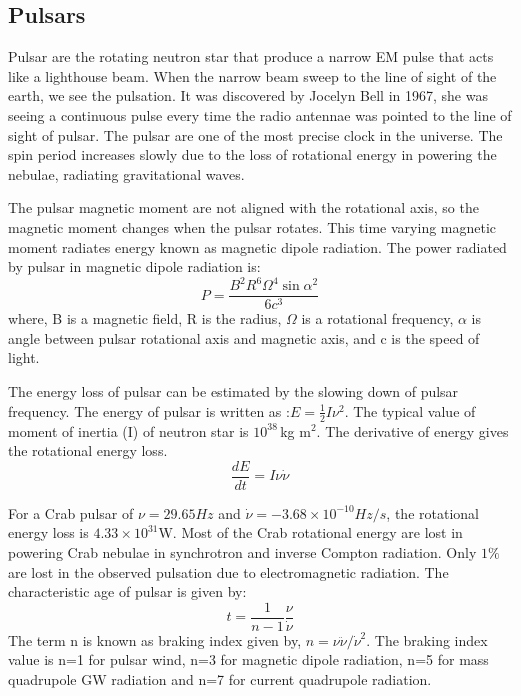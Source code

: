 \documentclass{ttuthes2007}
\begin{document}
\subsection{Pulsars}
Pulsar are the rotating neutron star that produce a narrow \ac{EM} pulse that
acts like a lighthouse beam. When the narrow beam sweep to the line of sight of
the earth, we see the pulsation.  It was discovered by Jocelyn Bell in 1967, she
was seeing a continuous pulse every time the radio antennae was pointed to the
line of sight of pulsar. The pulsar are one of the most precise clock in the
universe. The spin period increases slowly due to the loss of rotational energy
in powering the nebulae, radiating gravitational waves. 

The pulsar magnetic moment are not aligned with the rotational axis, so the
magnetic moment changes when the pulsar rotates. This time varying magnetic
moment radiates energy known as magnetic dipole radiation. The power radiated by
pulsar in magnetic dipole radiation is:
\begin{equation}
P= \frac{B^2R^6\Omega^4\sin{\alpha}^2}{6c^3}
\end{equation}
where, B is a magnetic field, R is the radius, $\Omega$ is a rotational
frequency, $\alpha$ is angle between pulsar rotational axis and magnetic axis,
and c is the speed of light.  

The energy loss of pulsar can be estimated by the slowing down of pulsar
frequency. The energy of pulsar is written as :$E=\frac{1}{2} I \nu^2$. The
typical value of moment of inertia (I) of neutron star is $10^{38}$\,kg m$^2$. The
derivative of energy gives the rotational energy loss.
\begin{equation}
\frac{dE}{dt}= I\nu\dot{\nu}
\end{equation}

For a Crab pulsar of $\nu=29.65Hz$ and $\dot{\nu}= -3.68\times10^{-10}Hz/s$, the
rotational energy loss is $4.33\times10^{31}$W. Most of the Crab rotational energy
are lost in powering Crab nebulae in synchrotron and inverse Compton radiation.
Only $1\%$ are lost  in the observed pulsation due to electromagnetic radiation.
The characteristic age of pulsar is given by:
\begin{equation}
t= \frac{1}{n-1}\frac{\nu}{\dot{\nu}}
\end{equation} 
The term n is known as braking index given by, $n=\nu\ddot{\nu}/\dot{\nu}^2$. 
The braking index value is n=1 for pulsar wind, n=3 for magnetic dipole
radiation, n=5 for mass quadrupole \ac{GW} radiation and n=7 for current
quadrupole radiation.
\end{document}

